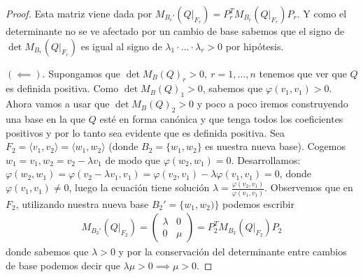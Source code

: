 \documentclass[14pt]{book}
\begin{document}
\begin{proof}
	Esta matriz viene dada por $M_{B_r'}(Q\vert_{F_r}) = P_r^TM_{B_r}(Q\vert_{F_r})P_r$. Y como el determinante no se ve afectado por un cambio de base sabemos que el signo de $\det M_{B_r}(Q\vert_{F_r})$ es igual al signo de $\lambda_1 \cdot \dots \cdot \lambda_r > 0$ por hipótesis.
	
	$(\impliedby)$. Supongamos que $\det M_B(Q)_r > 0,\ r = 1,\dots, n$ tenemos que ver que $Q$ es definida positiva. Como $\det M_B(Q)_1 > 0$, sabemos que $\varphi(v_1, v_1) > 0$. Ahora vamos a usar que $\det M_B(Q)_2 > 0$ y poco a poco iremos construyendo una base en la que $Q$ esté en forma canónica y que tenga todos los coeficientes positivos y por lo tanto sea evidente que es definida positiva. Sea $F_2 = \langle v_1, v_2 \rangle = \langle w_1, w_2 \rangle$ (donde $B_2 = \{w_1, w_2\}$ es nuestra nueva base). Cogemos $w_1 = v_1, w_2 = v_2 - \lambda v_1$ de modo que $\varphi(w_2, w_1) = 0$. Desarrollamos: $\varphi(w_2, w_1) = \varphi(v_2 - \lambda v_1, v_1) = \varphi(v_2, v_1) - \lambda\varphi(v_1, v_1) = 0$, donde $\varphi(v_1, v_1) ≠ 0$, luego la ecuación tiene solución $\lambda = \frac{\varphi(v_2, v_1)}{\varphi(v_1, v_1)}$. Observemos que en $F_2$, utilizando nuestra nueva base $B_2' = \{w_1, w_2)\}$ podemos escribir
	\begin{align*}
	M_{B_2'}(Q\vert_{F_2}) = \left(\begin{array}{cc}
		\lambda & 0 \\ 0 & \mu
		\end{array}\right) = P_2^T M_{B_2}(Q\vert_{F_2}) P_2
 	\end{align*}
 	donde sabemos que $\lambda > 0$ y por la conservación del determinante entre cambios de base podemos decir que $\lambda\mu > 0 \implies \mu > 0$.
 	

\end{proof}
\end{document}
